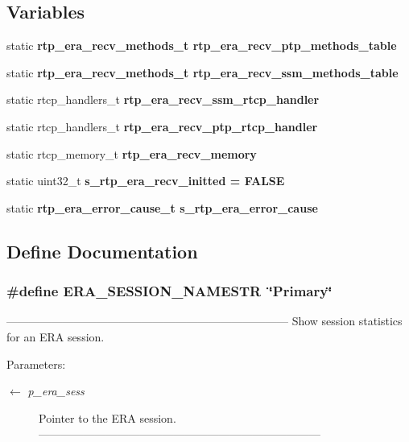 \subsection*{Variables}
\begin{CompactItemize}
\item 
static \bf{rtp\_\-era\_\-recv\_\-methods\_\-t} \bf{rtp\_\-era\_\-recv\_\-ptp\_\-methods\_\-table}
\item 
static \bf{rtp\_\-era\_\-recv\_\-methods\_\-t} \bf{rtp\_\-era\_\-recv\_\-ssm\_\-methods\_\-table}
\item 
static rtcp\_\-handlers\_\-t \bf{rtp\_\-era\_\-recv\_\-ssm\_\-rtcp\_\-handler}
\item 
static rtcp\_\-handlers\_\-t \bf{rtp\_\-era\_\-recv\_\-ptp\_\-rtcp\_\-handler}
\item 
static rtcp\_\-memory\_\-t \bf{rtp\_\-era\_\-recv\_\-memory}
\item 
static uint32\_\-t \bf{s\_\-rtp\_\-era\_\-recv\_\-initted} = \bf{FALSE}
\item 
static \bf{rtp\_\-era\_\-error\_\-cause\_\-t} \bf{s\_\-rtp\_\-era\_\-error\_\-cause}
\end{CompactItemize}


\subsection{Define Documentation}
\subsubsection{\setlength{\rightskip}{0pt plus 5cm}\#define ERA\_\-SESSION\_\-NAMESTR~\char`\"{}Primary\char`\"{}}\label{rtp__era__recv_8c_5fbb85752e0110cf429913009e238e1b}


--------------------------------------------------------------------------- Show session statistics for an ERA session.

\begin{Desc}
\item[Parameters:]
\begin{description}
\item[\mbox{$\leftarrow$} {\em p\_\-era\_\-sess}]Pointer to the ERA session. --------------------------------------------------------------------------- \end{description}
\end{Desc}

